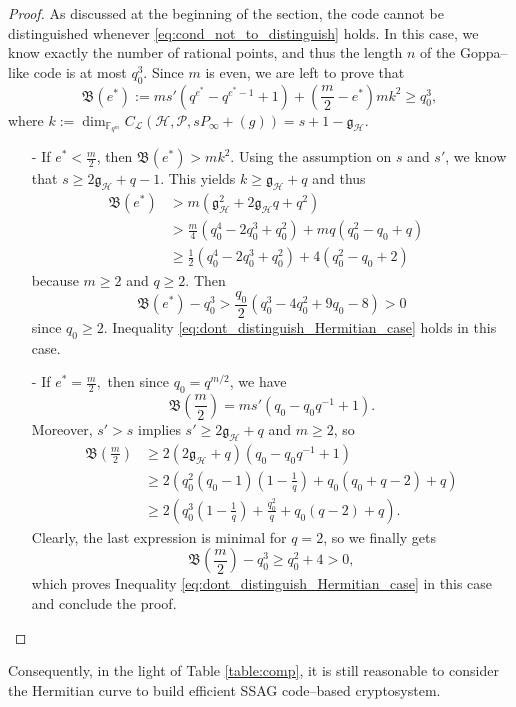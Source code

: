 \documentclass[journal]{IEEEtran}
\theoremstyle{plain}
\theoremstyle{definition}
\theoremstyle{remark}
\newcommand{\calP}{\mathcal{P}}
\newcommand{\calH}{\mathcal{H}}
\newcommand{\fqm}{\mathbb{F}_{q^m}}
\begin{document}
	\begin{proof}
		As discussed at the beginning of the section, the code cannot be distinguished whenever \eqref{eq:cond_not_to_distinguish} holds. In this case, we know exactly the number of rational points, and thus the length $n$ of the Goppa--like code is at most $q_0^3$. Since $m$ is even, we are left to prove that 
		\begin{equation} \label{eq:dont_distinguish_Hermitian_case}
			\mathfrak{B}(e^*) := ms'(q^{e^*}-q^{e^*-1}+1) + \left( \frac{m}{2}-e^*\right)mk^2 \geq q_0^3,
		\end{equation}
		where $k  := \dim_{\fqm} C_{\mathcal{L}}(\calH, \calP, sP_\infty + (g)) = s+1-\mathfrak{g}_{\calH}$.
		\begin{itemize}
			\item [-] If $e^* < \frac{m}{2}$, then $\mathfrak{B}(e^*) > mk^2$. Using the assumption on $s$ and $s'$, we know that $s \geq 2\mathfrak{g}_{\calH}+q-1$. This yields $k \geq \mathfrak{g}_{\calH}+q$ and thus
			\begin{align*}
				\mathfrak{B}(e^*) 
				&> m(\mathfrak{g}_{\calH}^2+2\mathfrak{g}_{\calH}q+q^2)&\\
				& > \frac{m}{4}(q_0^4-2q_0^3+q_0^2) + mq(q_0^2-q_0+q)&\\
				& \geq \frac{1}{2}(q_0^4-2q_0^3+q_0^2)+4(q_0^2-q_0+2)
			\end{align*}
		because $m\geq 2$ and $q\geq 2$. Then 
		\[\mathfrak{B}(e^*) -q_0^3 > \frac{q_0}{2} (q_0^3-4q_0^2+9q_0-8) > 0 \]
			since $q_0 \geq 2$. Inequality \eqref{eq:dont_distinguish_Hermitian_case} holds in this case.
			\item[-] If $e^* = \frac{m}{2},$ then since $q_0=q^{m/2}$, we have 
			\[\mathfrak{B}\left(\frac{m}{2}\right) = ms'(q_0-q_0q^{-1}+1).\]
			 Moreover, $s'>s$ implies $s' \geq 2\mathfrak{g}_{\calH}+q$ and $m \geq 2$, so
			\begin{align*}
				\mathfrak{B}\left(\frac{m}{2}\right)
				&\geq 2(2\mathfrak{g}_{\calH}+q)(q_0-q_0q^{-1}+1)\\ 
				&\geq 2\left(q_0^2(q_0-1)\left(1-\frac{1}{q}\right)+q_0(q_0+q-2)+q\right) \\
				& \geq 2\left( q_0^3\left(1 - \frac{1}{q}\right)+ \frac{q_0^2}{q}+ q_0(q-2)+q\right).
			\end{align*}
			Clearly, the last expression is minimal for $q=2$, so we finally gets
			$$\mathfrak{B}\left(\frac{m}{2}\right)-q_0^3 \geq q_0^2 + 4 >0,$$
			which proves Inequality \eqref{eq:dont_distinguish_Hermitian_case} in this case and conclude the proof.
		\end{itemize}
	\end{proof}
	Consequently, in the light of Table \ref{table:comp}, it is still reasonable to consider the Hermitian curve to build efficient SSAG code--based cryptosystem.
	

	
	

	
	\newpage
	


\end{document}
